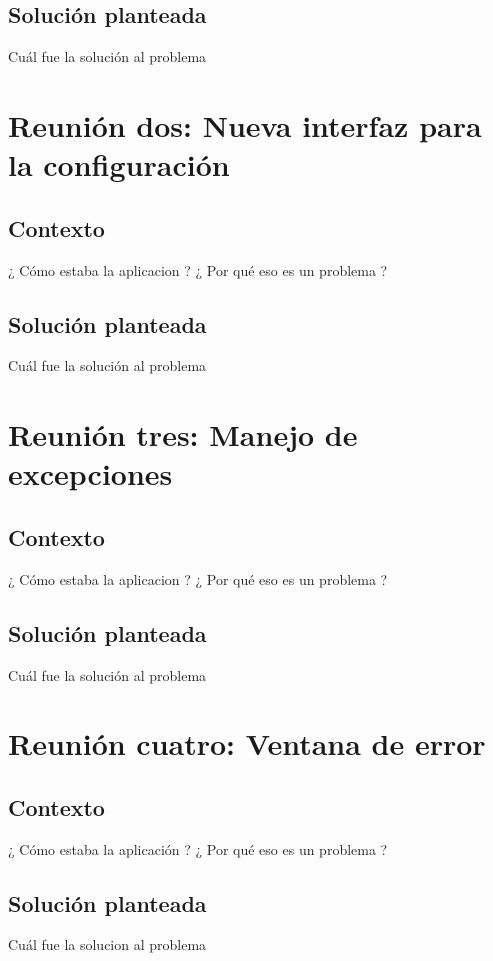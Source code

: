 \documentclass[a4paper,oneside,10pt]{article}
\begin{document}
\subsection{Soluci\'on planteada}
Cu\'al fue la soluci\'on al problema

\section{Reuni\'on dos: Nueva interfaz para la configuraci\'on}

\subsection{Contexto}
¿ C\'omo estaba la aplicacion ? ¿ Por qu\'e eso es un problema ?

\subsection{Soluci\'on planteada}
Cu\'al fue la soluci\'on al problema

\section{Reuni\'on tres: Manejo de excepciones}

\subsection{Contexto}
¿ C\'omo estaba la aplicacion ? ¿ Por qu\'e eso es un problema ?

\subsection{Soluci\'on planteada}
Cu\'al fue la soluci\'on al problema

\section{Reuni\'on cuatro: Ventana de error}

\subsection{Contexto}
¿ C\'omo estaba la aplicaci\'on ? ¿ Por qu\'e eso es un problema ?

\subsection{Soluci\'on planteada}
Cu\'al fue la solucion al problema
\end{document}
